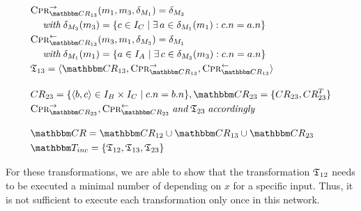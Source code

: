 \begin{align*}
    & 
    \consistencypreservationrule{\consistencyrelationset{CR}_{13}}^{\rightarrow}(\model{m}{1}, \model{m}{3}, \change{\metamodel{M}{1}}) = \change{\metamodel{M}{3}} \\
    & \formulaskip
    \mathtext{with} \change{\metamodel{M}{3}}(\model{m}{3}) = \setted{c \in \metamodelinstances{\class{C}{}} \mid \exists a \in \change{\metamodel{M}{1}}(\model{m}{1}) : c.n = a.n} \\
    & 
    \consistencypreservationrule{\consistencyrelationset{CR}_{13}}^{\leftarrow}(\model{m}{3}, \model{m}{1}, \change{\metamodel{M}{3}}) = \change{\metamodel{M}{1}} \\
    & \formulaskip
    \mathtext{with} \change{\metamodel{M}{1}}(\model{m}{1}) = \setted{a \in \metamodelinstances{\class{A}{}} \mid \exists c \in \change{\metamodel{M}{3}}(\model{m}{3}) : c.n = a.n} \\
    & 
    \transformation{T}_{13} = \tupled{\consistencyrelationset{CR}_{13}, \consistencypreservationrule{\consistencyrelationset{CR}_{13}}^{\rightarrow}, \consistencypreservationrule{\consistencyrelationset{CR}_{13}}^{\leftarrow}} \\[1em]
    &
    \consistencyrelation{CR}{23} = \setted{\tupled{b,c} \in \metamodelinstances{\class{B}{}} \times \metamodelinstances{\class{C}{}} \mid c.n = b.n}, \consistencyrelationset{CR}_{23} = \setted{\consistencyrelation{CR}{23}, \consistencyrelation{CR}{23}^T} \\
    & 
    \consistencypreservationrule{\consistencyrelationset{CR}_{23}}^{\rightarrow}, \consistencypreservationrule{\consistencyrelationset{CR}_{23}}^{\leftarrow} \mathtext{and} \transformation{T}_{23} \mathtext{accordingly} \\[1em]
    &
    \consistencyrelationset{CR} = \consistencyrelationset{CR}_{12} \cup \consistencyrelationset{CR}_{13} \cup \consistencyrelationset{CR}_{23} \\
    &
    \transformationset{T}_{inc} = \setted{\transformation{T}_{12}, \transformation{T}_{13}, \transformation{T}_{23}}
\end{align*}

For these transformations, we are able to show that the transformation $\mathfrak{T}_{12}$ needs to be executed a minimal number of depending on $x$ for a specific input.
Thus, it is not sufficient to execute each transformation only once in this network.

